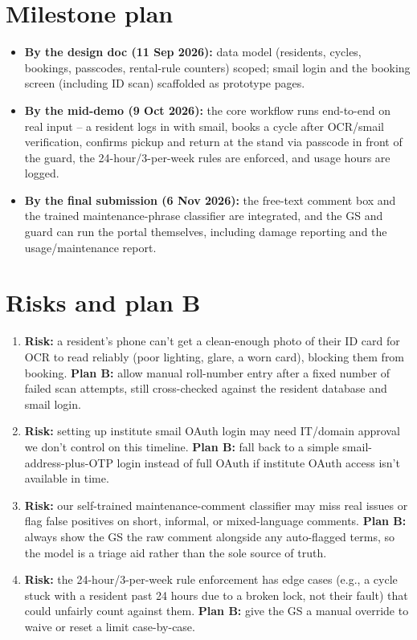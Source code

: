 \documentclass[11pt]{article}
\begin{document}
\section{Milestone plan}
\begin{itemize}[leftmargin=*]
  \item \textbf{By the design doc (11 Sep 2026):} data model (residents, cycles, bookings, passcodes, rental-rule counters) scoped; smail login and the booking screen (including ID scan) scaffolded as prototype pages.
  \item \textbf{By the mid-demo (9 Oct 2026):} the core workflow runs end-to-end on real input -- a resident logs in with smail, books a cycle after OCR/smail verification, confirms pickup and return at the stand via passcode in front of the guard, the 24-hour/3-per-week rules are enforced, and usage hours are logged.
  \item \textbf{By the final submission (6 Nov 2026):} the free-text comment box and the trained maintenance-phrase classifier are integrated, and the GS and guard can run the portal themselves, including damage reporting and the usage/maintenance report.
\end{itemize}

\section{Risks and plan B}
\begin{enumerate}[leftmargin=*]
  \item \textbf{Risk:} a resident's phone can't get a clean-enough photo of their ID card for OCR to read reliably (poor lighting, glare, a worn card), blocking them from booking. \textbf{Plan B:} allow manual roll-number entry after a fixed number of failed scan attempts, still cross-checked against the resident database and smail login.
  \item \textbf{Risk:} setting up institute smail OAuth login may need IT/domain approval we don't control on this timeline. \textbf{Plan B:} fall back to a simple smail-address-plus-OTP login instead of full OAuth if institute OAuth access isn't available in time.
  \item \textbf{Risk:} our self-trained maintenance-comment classifier may miss real issues or flag false positives on short, informal, or mixed-language comments. \textbf{Plan B:} always show the GS the raw comment alongside any auto-flagged terms, so the model is a triage aid rather than the sole source of truth.
  \item \textbf{Risk:} the 24-hour/3-per-week rule enforcement has edge cases (e.g., a cycle stuck with a resident past 24 hours due to a broken lock, not their fault) that could unfairly count against them. \textbf{Plan B:} give the GS a manual override to waive or reset a limit case-by-case.
\end{enumerate}
\end{document}
